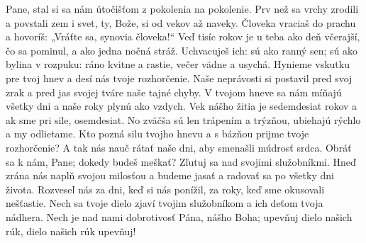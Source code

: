 Pane, stal si sa nám útočišťom
z pokolenia na pokolenie.
\versseparator
Prv než sa vrchy zrodili a povstali zem i svet,
ty, Bože, si od vekov až naveky.
\versseparator
Človeka vraciaš do prachu
a hovoríš: „Vráťte sa, synovia človeka!“
\versseparator
Veď tisíc rokov je u teba
ako deň včerajší, čo sa pominul,
\versseparator
a ako jedna nočná stráž.
Uchvacuješ ich: sú ako ranný sen;
\versseparator
sú ako bylina v rozpuku:
ráno kvitne a rastie,
večer vädne a usychá.
\versseparator
Hynieme vskutku pre tvoj hnev
a desí nás tvoje rozhorčenie.
\versseparator
Naše neprávosti si postavil pred svoj zrak
a pred jas svojej tváre naše tajné chyby.
\versseparator
V tvojom hneve sa nám míňajú všetky dni
\versseparator
a naše roky plynú ako vzdych.
Vek nášho žitia je sedemdesiat rokov
\versseparator
a ak sme pri sile, osemdesiat.
No zväčša sú len trápením a trýzňou,
\versseparator
ubiehajú rýchlo a my odlietame.
\versseparator
Kto pozná silu tvojho hnevu
a s bázňou prijme tvoje rozhorčenie?
\versseparator
A tak nás nauč rátať naše dni,
aby smenašli múdrosť srdca.
\versseparator
Obráť sa k nám, Pane; dokedy budeš meškať?
Zľutuj sa nad svojimi služobníkmi.
\versseparator
Hneď zrána nás naplň svojou milosťou
a budeme jasať a radovať sa po všetky dni života.
\versseparator
Rozveseľ nás za dni, keď si nás ponížil,
za roky, keď sme okusovali nešťastie.
\versseparator
Nech sa tvoje dielo zjaví tvojim služobníkom
a ich deťom tvoja nádhera.
\versseparator
Nech je nad nami dobrotivosť Pána, nášho Boha;
upevňuj dielo našich rúk,
dielo našich rúk upevňuj!